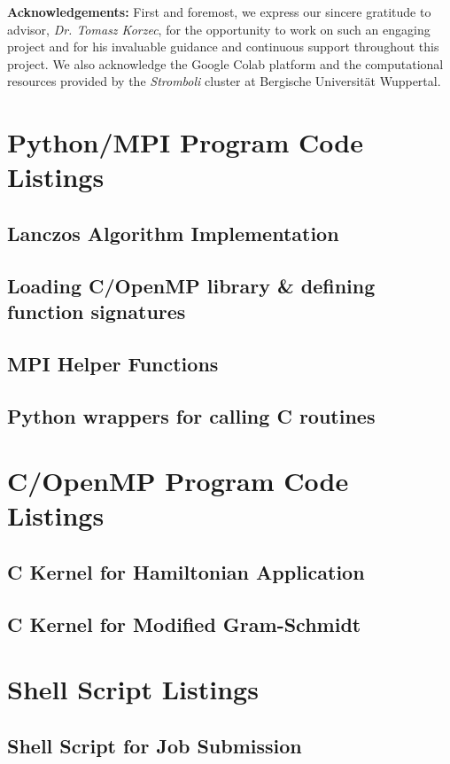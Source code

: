 \documentclass[12pt,a4paper]{report}
\begin{document}
\bigskip
\noindent\textbf{Acknowledgements:} First and foremost, we express our sincere gratitude to advisor, \textit{Dr. Tomasz Korzec}, for the opportunity to work on such an engaging project and for his invaluable guidance and continuous support throughout this project. We also acknowledge the Google Colab platform and the computational resources provided by the \textit{Stromboli} cluster at Bergische Universität Wuppertal.


\appendix
\appendixpage

\chapter{Python/MPI Program Code Listings}
\section{Lanczos Algorithm Implementation}

\section{Loading C/OpenMP library \& defining function signatures}

\section{MPI Helper Functions}

\section{Python wrappers for calling C routines}


\chapter{C/OpenMP Program Code Listings}
\section{C Kernel for Hamiltonian Application}

\section{C Kernel for Modified Gram-Schmidt}


\chapter{Shell Script Listings}
\section{Shell Script for Job Submission}



\printbibliography[heading=bibintoc]


\end{document}
